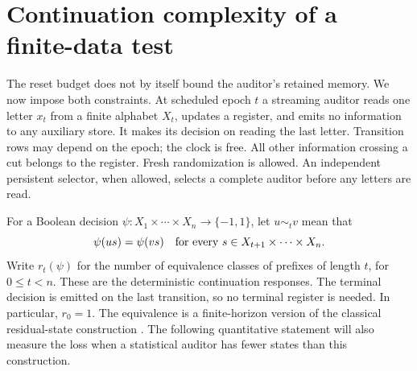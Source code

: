 \section{Continuation complexity of a finite-data test}
\label{sec:v19-streaming}
The reset budget does not by itself bound the auditor's retained memory.
We now impose both constraints. At scheduled epoch $t$ a streaming auditor
reads one letter $x_t$ from a finite alphabet $X_t$, updates a register,
and emits no information to any auxiliary store. It makes its decision on
reading the last letter. Transition rows may depend on the epoch; the clock
is free. All other information crossing a cut belongs to the register.
Fresh randomization is allowed. An independent persistent selector, when
allowed, selects a complete auditor before any letters are read.

For a Boolean decision $\psi:X_1\times\cdots\times X_n\to\{-1,1\}$,
let $u\sim_t v$ mean that
\[
 \psi(us)=\psi(vs)\quad\hbox{for every }s\in X_{t+1}\times\cdots\times X_n.
\]
Write $r_t(\psi)$ for the number of equivalence classes of prefixes of
length $t$, for $0\le t<n$. These are the deterministic continuation
responses. The terminal decision is emitted on the last transition, so no
terminal register is needed. In particular, $r_0=1$. The equivalence is a
finite-horizon version of the classical residual-state construction
\cite{Nerode1958}. The following quantitative statement will also measure
the loss when a statistical auditor has fewer states than this construction.

